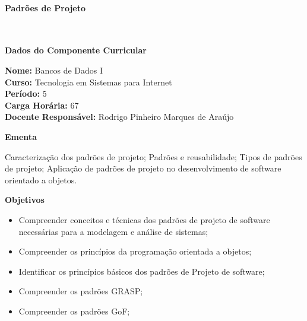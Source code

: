 \paragraph{Padrões de Projeto} \


\begin{snugshade}\begin{center}\textbf{
	Dados do Componente Curricular
}\end{center}\end{snugshade}

\noindent 	\textbf{Nome:} Bancos de Dados I
\\ 			\textbf{Curso:} Tecnologia em Sistemas para Internet
\\ 			\textbf{Período:} \unit{5}{\degree}
\\ 			\textbf{Carga Horária:} \unit{67}{\hour}
\\ 			\textbf{Docente Responsável:} Rodrigo Pinheiro Marques de Araújo


\begin{snugshade}\begin{center}\textbf{
    Ementa
\vphantom{q}}\end{center}\end{snugshade}

\noindent
Caracterização dos padrões de projeto; Padrões e reusabilidade; Tipos de padrões de projeto; Aplicação de padrões de projeto no desenvolvimento de software orientado a objetos.


\begin{snugshade}\begin{center}\textbf{
    Objetivos
}\end{center}\end{snugshade}


\begin{itemize}

\item Compreender conceitos e técnicas dos padrões de projeto de software necessárias para a modelagem e análise de sistemas;
\item Compreender os princípios da programação orientada a objetos;
\item Identificar os princípios básicos dos padrões de Projeto de software;
\item Compreender os padrões GRASP;
\item Compreender os padrões GoF;

\end{itemize}

